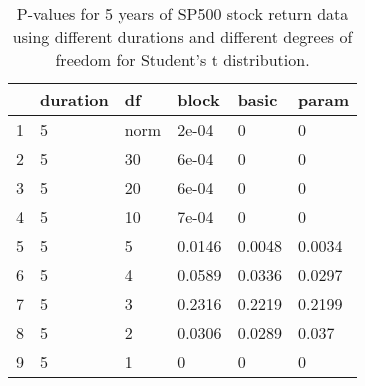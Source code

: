 \begin{table}[ht]
\centering
\caption{P-values for 5 years of SP500 stock return 
                   data using different durations
  and different degrees of freedom for Student's t distribution.} 
\label{table:SP5005}
\begin{tabular}{rlllll}
  \hline
 & duration & df & block & basic & param \\ 
  \hline
1 & 5 & norm & 2e-04 & 0 & 0 \\ 
  2 & 5 & 30 & 6e-04 & 0 & 0 \\ 
  3 & 5 & 20 & 6e-04 & 0 & 0 \\ 
  4 & 5 & 10 & 7e-04 & 0 & 0 \\ 
  5 & 5 & 5 & 0.0146 & 0.0048 & 0.0034 \\ 
  6 & 5 & 4 & 0.0589 & 0.0336 & 0.0297 \\ 
  7 & 5 & 3 & 0.2316 & 0.2219 & 0.2199 \\ 
  8 & 5 & 2 & 0.0306 & 0.0289 & 0.037 \\ 
  9 & 5 & 1 & 0 & 0 & 0 \\ 
   \hline
\end{tabular}
\end{table}

